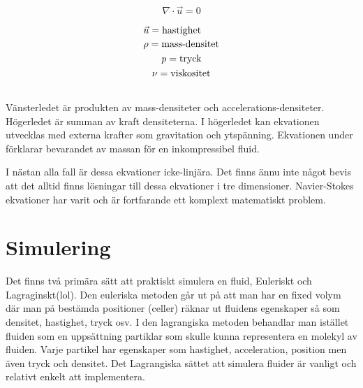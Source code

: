 \documentclass[a4paper,12pt,oneside,final]{extarticle}
\begin{document}
\begin{equation}
\nabla \cdot \vec{u} = 0
\end{equation}

\begin{equation*}
\begin{aligned}
\begin{multlined}
\vec{u} = \mbox{hastighet} \\
\rho = \mbox{mass-densitet} \\
\it{p} = \mbox{tryck} \\
\nu = \mbox{viskositet} \\
\end{multlined}
\end{aligned}
\end{equation*}
Vänsterledet är produkten av mass-densiteter och accelerations-densiteter.
Högerledet är summan av kraft densiteterna.
I högerledet kan ekvationen utvecklas med externa krafter som gravitation och ytspänning.
Ekvationen under förklarar bevarandet av massan för en inkompressibel fluid.

I nästan alla fall är dessa ekvationer icke-linjära.
Det finns ännu inte något bevis att det alltid finns lösningar till dessa ekvationer i tre dimensioner.
Navier-Stokes ekvationer har varit och är fortfarande ett komplext matematiskt problem.

\section{Simulering}
Det finns två primära sätt att praktiskt simulera en fluid, Euleriskt och Lagraginskt(lol).
Den euleriska metoden går ut på att man har en fixed volym där man på bestämda positioner (celler) räknar ut fluidens egenskaper så som densitet, hastighet, tryck osv.
I den lagrangiska metoden behandlar man istället fluiden som en uppsättning partiklar som skulle kunna representera en molekyl av fluiden.
Varje partikel har egenskaper som hastighet, acceleration, position men även tryck och densitet.
Det Lagrangiska sättet att simulera fluider är vanligt och relativt enkelt att implementera.
\end{document}
